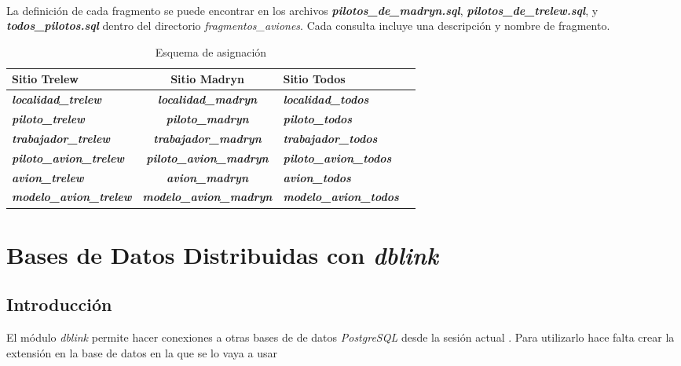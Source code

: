 ~\\

La definición de cada fragmento se puede encontrar en los archivos \textbf{\emph{pilotos\_de\_madryn.sql}}, \textbf{\emph{pilotos\_de\_trelew.sql}}, y \textbf{\emph{todos\_pilotos.sql}} dentro del directorio \emph{fragmentos\_aviones}. Cada consulta incluye una descripción y nombre de fragmento.

\begin{center}
    \begin{table}[H]
        \begin{tabular}{| p{5cm} | c | p{5cm} | p{4cm} |}
            \hline
            Sitio Trelew & Sitio Madryn & Sitio Todos\\ \hline
            \textbf{\emph{localidad\_trelew}} & \textbf{\emph{localidad\_madryn}} & \textbf{\emph{localidad\_todos}}\\ \hline
            \textbf{\emph{piloto\_trelew}} & \textbf{\emph{piloto\_madryn}} & \textbf{\emph{piloto\_todos}}\\ \hline
            \textbf{\emph{trabajador\_trelew}} & \textbf{\emph{trabajador\_madryn}} & \textbf{\emph{trabajador\_todos}}\\ \hline
            \textbf{\emph{piloto\_avion\_trelew}} & \textbf{\emph{piloto\_avion\_madryn}} & \textbf{\emph{piloto\_avion\_todos}}\\ \hline
            \textbf{\emph{avion\_trelew}} & \textbf{\emph{avion\_madryn}} & \textbf{\emph{avion\_todos}}\\ \hline
            \textbf{\emph{modelo\_avion\_trelew}} & \textbf{\emph{modelo\_avion\_madryn}} & \textbf{\emph{modelo\_avion\_todos}}\\ \hline
        \end{tabular}
    \caption{\label{tab:table-name}Esquema de asignación}
    \end{table}
\end{center}


\section{Bases de Datos Distribuidas con \emph{dblink}}

\subsection{Introducción}
El módulo \emph{dblink} permite hacer conexiones a otras bases de de datos \emph{PostgreSQL} desde la sesión actual \autocite{dblink-intro}. Para utilizarlo hace falta crear la extensión en la base de datos en la que se lo vaya a usar

